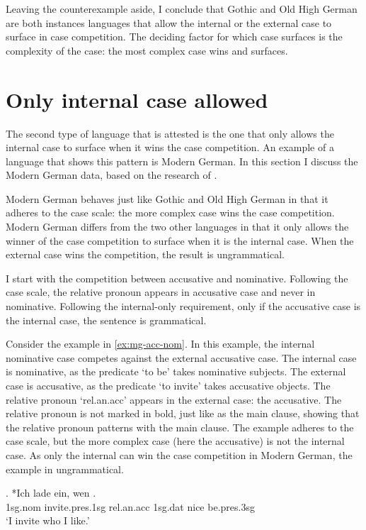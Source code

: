 Leaving the counterexample aside, I conclude that Gothic and Old High German are both instances languages that allow the internal or the external case to surface in case competition. The deciding factor for which case surfaces is the complexity of the case: the most complex case wins and surfaces.


\section{Only internal case allowed}\label{sec:pattern-ii}

The second type of language that is attested is the one that only allows the internal case to surface when it wins the case competition. An example of a language that shows this pattern is Modern German. In this section I discuss the Modern German data, based on the research of \citet{vogel2001}.

Modern German behaves just like Gothic and Old High German in that it adheres to the case scale: the more complex case wins the case competition. Modern German differs from the two other languages in that it only allows the winner of the case competition to surface when it is the internal case. When the external case wins the competition, the result is ungrammatical.

I start with the competition between accusative and nominative. Following the case scale, the relative pronoun appears in accusative case and never in nominative. Following the internal-only requirement, only if the accusative case is the internal case, the sentence is grammatical.

Consider the example in \ref{ex:mg-acc-nom}. In this example, the internal nominative case competes against the external accusative case.
The internal case is nominative, as the predicate  `to be' takes nominative subjects.
The external case is accusative, as the predicate  `to invite' takes accusative objects.
The relative pronoun  `\ac{rel}.\ac{an}.\ac{acc}' appears in the external case: the accusative. The relative pronoun is not marked in bold, just like as the main clause, showing that the relative pronoun patterns with the main clause.
The example adheres to the case scale, but the more complex case (here the accusative) is not the internal case. As only the internal can win the case competition in Modern German, the example in ungrammatical.

\exg. *Ich {lade ein}, wen   .\\
 1\ac{sg}.\ac{nom} invite.\ac{pres}.1\ac{sg}\scsub{[acc]} \ac{rel}.\ac{an}.\ac{acc} 1\ac{sg}.\ac{dat} nice be.\ac{pres}.3\ac{sg}\scsub{[nom]}\\
 `I invite who I like.' \label{ex:mg-acc-nom}

